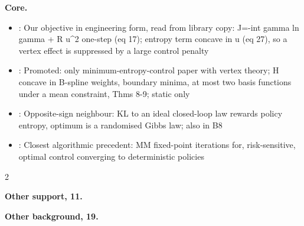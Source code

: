 \documentclass[10pt]{article}
\newcommand{\memb}[1]{\par\smallskip\textbf{#1}\quad}
\begin{document}
\memb{Core.}
\begin{itemize}[nosep,leftmargin=1.2em]
\item \citet{Wang-minimum02}: Our objective in engineering form, read from library copy: J=-int gamma ln gamma + R u\^{}2 one-step (eq 17); entropy term concave in u (eq 27), so a vertex effect is suppressed by a large control penalty
\item \citet{Yue-minimum06}: Promoted: only minimum-entropy-control paper with vertex theory; H concave in B-spline weights, boundary minima, at most two basis functions under a mean constraint, Thms 8-9; static only
\item \citet{Karny-fully06}: Opposite-sign neighbour: KL to an ideal closed-loop law rewards policy entropy, optimum is a randomised Gibbs law; also in B8
\item \citet{Lefebvre-probabilistic24}: Closest algorithmic precedent: MM fixed-point iterations for, risk-sensitive, optimal control converging to deterministic policies
\end{itemize}
\begin{multicols}{2}
\memb{Other support, 11.} \citetext{\citealp{Yue-minimum03}; \citealp{Ren-minimum12}; \citealp{Zhou-nongaussian18}; \citealp{Astrom-computer67}; \citealp{Astrom-self73}; \citealp{Harris-assessment89}; \citealp{Freudenberg-minimum11}; \citealp{Singh-finite23}; \citealp{Karny-towards96}; \citealp{Karny-axiomatisation12}; \citealp{Garrabe-probabilistic22}}

\memb{Other background, 19.} {\footnotesize \citetext{\citealp{Erdogmus-error02}; \citealp{Guo-minimum06}; \citealp{Salarieh-stabilizing08}; \citealp{Afshar-ilc09}; \citealp{Principe-information10}; \citealp{Ren-minimized14}; \citealp{Zhang-minimum14}; \citealp{Zhou-ekf18}; \citealp{Wiener-extrapolation49}; \citealp{Kalman-new60}; \citealp{Clarke-self75}; \citealp{Grimble-generalized88}; \citealp{Huang-performance99}; \citealp{Kumar-stochastic15}; \citealp{Liu-strong26}; \citealp{Herzallah-fully11}; \citealp{Quinn-fully16}; \citealp{Karny-axiomatisation20}; \citealp{Shafiei-distributionally25}}}

\end{multicols}
\end{document}
